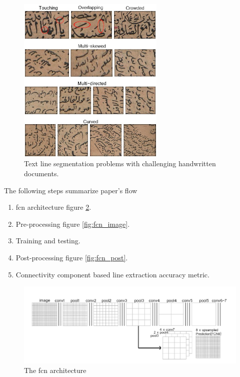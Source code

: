 \begin{figure}[!htb]
    \centering
    \includegraphics[width=7cm]{images/text line segmentation problems.jpg}
    \caption{Text line segmentation problems with challenging handwritten documents.}
    \label{fig:text line problems}
\end{figure}

\noindent
The following steps summarize paper's flow
\begin{enumerate}
  \item \acrshort{fcn} architecture figure \ref{fig:fcn_arc}.
  \item Pre-processing figure \ref{fig:fcn_image}.
  \item Training and testing.
  \item Post-processing figure \ref{fig:fcn_post}.
  \item Connectivity component based line extraction accuracy metric.
\end{enumerate}

\begin{figure}[!htb]
    \centering
    \includegraphics[width=15cm]{images/FCN_arc.png}
    \caption{The \acrshort{fcn} architecture}
    \label{fig:fcn_arc}
\end{figure}


